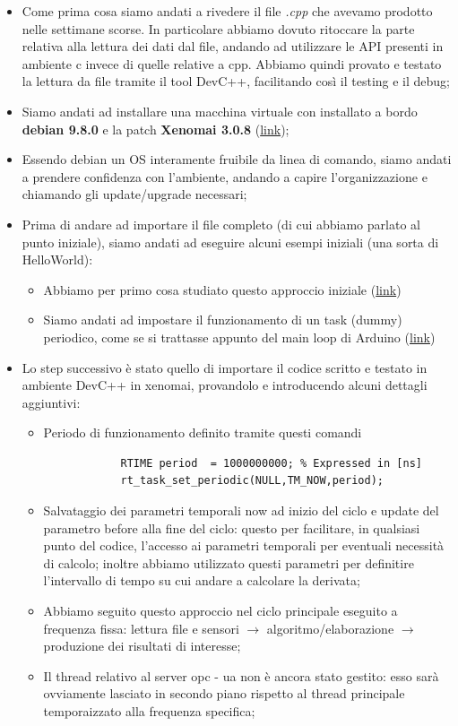 \begin{itemize}
	\item Come prima cosa siamo andati a rivedere il file \textit{.cpp} che avevamo prodotto nelle settimane scorse. In particolare abbiamo dovuto ritoccare la parte relativa alla lettura dei dati dal file, andando ad utilizzare le API presenti in ambiente c invece di quelle relative a cpp.
	Abbiamo quindi provato e testato la lettura da file tramite il tool DevC++, facilitando così il testing e il debug;
	\item Siamo andati ad installare una macchina virtuale con installato a bordo \textbf{debian 9.8.0} e la patch \textbf{Xenomai 3.0.8} (\href{http://www.cs.ru.nl/lab/xenomai/}{link});
	\item Essendo debian un OS interamente fruibile da linea di comando, siamo andati a prendere confidenza con l'ambiente, andando a capire l'organizzazione e chiamando gli update/upgrade necessari;
	\item Prima di andare ad importare il file completo (di cui abbiamo parlato al punto iniziale), siamo andati ad eseguire alcuni esempi iniziali (una sorta di HelloWorld):
	\begin{itemize}
		\item Abbiamo per primo cosa studiato questo approccio iniziale (\href{http://www.cs.ru.nl/J.Hooman/DES/XenomaiExercises/Exercise-1.html}{link})
		\item Siamo andati ad impostare il funzionamento di un task (dummy) periodico, come se si trattasse appunto del main loop di Arduino (\href{http://www.cs.ru.nl/lab/xenomai/}{link})
	\end{itemize}
	
	\item Lo step successivo è stato quello di importare il codice scritto e testato in ambiente DevC++ in xenomai, provandolo e introducendo alcuni dettagli aggiuntivi:
	\begin{itemize}
		\item Periodo di funzionamento definito tramite questi comandi 
		\begin{lstlisting}
			RTIME period  = 1000000000; % Expressed in [ns]
			rt_task_set_periodic(NULL,TM_NOW,period);
		\end{lstlisting}
		\item Salvataggio dei parametri temporali now ad inizio del ciclo e update del parametro before alla fine del ciclo: questo per facilitare, in qualsiasi punto del codice, l'accesso ai parametri temporali per eventuali necessità di calcolo; inoltre abbiamo utilizzato questi parametri per definitire l'intervallo di tempo su cui andare a calcolare la derivata;
		\item Abbiamo seguito questo approccio nel ciclo principale eseguito a frequenza fissa: lettura file e sensori $\rightarrow$ algoritmo/elaborazione $\rightarrow$ produzione dei risultati di interesse;
		\item Il thread relativo al server opc - ua non è ancora stato gestito: esso sarà ovviamente lasciato in secondo piano rispetto al thread principale temporaizzato alla frequenza specifica;
	\end{itemize}
\end{itemize}
